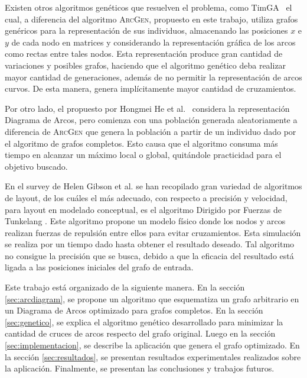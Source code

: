 	Existen otros  algoritmos genéticos que resuelven el problema, como  TimGA \cite{eloranta2001timga}\ el cual, a diferencia del algoritmo \textsc{ArcGen}, propuesto en este trabajo, utiliza grafos genéricos para la representación de sus individuos, almacenando las posiciones $x$ e $y$ de cada nodo en matrices y considerando la representación gráfica de los arcos como rectas entre tales nodos. Esta representación produce gran cantidad de variaciones y posibles grafos, haciendo que el algoritmo genético deba realizar mayor cantidad de generaciones, además de no permitir la representación de arcos curvos. De esta manera, genera implícitamente mayor cantidad de cruzamientos. 
	
	Por otro lado, el propuesto por Hongmei He et al. \cite{he2007parallelisation}\ considera la representación  Diagrama de Arcos, pero comienza con una población generada aleatoriamente a diferencia de \textsc{ArcGen} que genera la población a partir de un individuo dado por el algoritmo de grafos completos. Esto causa que el algoritmo consuma más tiempo en alcanzar un máximo local o global, quitándole practicidad para el objetivo buscado.
	
	En el survey de Helen Gibson et al. \cite{gibson2013survey} se han recopilado gran variedad de algoritmos de layout, de los cuáles el más adecuado, con respecto a precisión y velocidad, para layout en modelado conceptual, es el algoritmo Dirigido por Fuerzas de Tunkelang \cite{tunkelang1998jiggle}. Este algoritmo  propone un modelo físico donde los nodos y arcos realizan fuerzas de repulsión entre ellos para evitar cruzamientos. Esta simulación se realiza por un tiempo dado hasta obtener el resultado deseado. Tal algoritmo no consigue la precisión que se busca, debido a que la eficacia del resultado está ligada a las posiciones iniciales del grafo de entrada. %
	
	Este trabajo está organizado de la siguiente manera. En la sección 	\ref{sec:arcdiagram},  se propone un algoritmo  que esquematiza  un grafo arbitrario en un Diagrama de Arcos optimizado para grafos completos. En la sección \ref{sec:genetico}, se explica el algoritmo genético desarrollado para minimizar la cantidad de cruces de arcos  respecto del  grafo original. Luego en la sección \ref{sec:implementacion}, se describe la aplicación que genera el grafo optimizado. En la sección \ref{sec:resultados}, se presentan resultados experimentales realizados  sobre la aplicación. Finalmente, se presentan las conclusiones y trabajos futuros.

